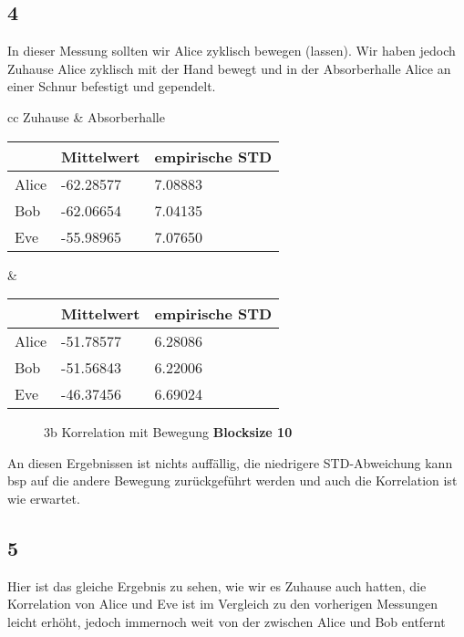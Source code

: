 \documentclass[12pt,a4paper]{article}
\begin{document}
\subsection*{4}
In dieser Messung sollten wir Alice zyklisch bewegen (lassen). Wir haben jedoch Zuhause Alice zyklisch mit der Hand bewegt und in der Absorberhalle Alice an einer Schnur befestigt und gependelt.
\begin{table}[H]
\centering
\begin{tabular}{ cc }
Zuhause & Absorberhalle  \\
\begin{tabular}{l|l|l}
& Mittelwert & empirische STD \\
\hline
Alice & -62.28577 & 7.08883 \\
\hline
Bob & -62.06654 & 7.04135 \\
\hline
Eve & -55.98965 & 7.07650 \\
\end{tabular} &
\begin{tabular}{l|l|l}
& Mittelwert & empirische STD \\
\hline
Alice & -51.78577 & 6.28086 \\
\hline
Bob & -51.56843 & 6.22006 \\
\hline
Eve & -46.37456 & 6.69024 \\
\end{tabular}
\end{tabular}
\end{table}

\begin{figure}[H]
\centering
{}   \qquad
{}
\caption{3b Korrelation mit Bewegung  \textbf{Blocksize 10}}
\label{fig:4}
\end{figure}
An diesen Ergebnissen ist nichts auffällig, die niedrigere STD-Abweichung kann bsp auf die andere Bewegung zurückgeführt werden und auch die Korrelation ist wie erwartet.
\subsection*{5}
Hier ist das gleiche Ergebnis zu sehen, wie wir es Zuhause auch hatten, die Korrelation von Alice und Eve ist im Vergleich zu den vorherigen Messungen leicht erhöht, jedoch immernoch weit von der zwischen Alice und Bob entfernt
\end{document}
